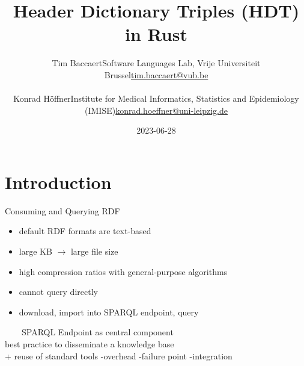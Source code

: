 \documentclass[14pt,aspectratio=169]{beamer}
\date{2023-06-28}
\author{
\small
\texorpdfstring{Tim Baccaert\newline{}Software Languages Lab, Vrije Universiteit Brussel\newline{}\url{tim.baccaert@vub.be}}{Tim Baccaert}\\~\\
\texorpdfstring{Konrad Höffner\newline{}Institute for Medical Informatics, Statistics and Epidemiology (IMISE)\newline{}\url{konrad.hoeffner@uni-leipzig.de}}{Konrad Höffner}
}
\title{Header Dictionary Triples (HDT) in Rust}
\subtitle{}
\newcommand{\imageslide}[4][]
{
\begin{frame}[plain]{~~~~#2}
\vspace{0.2em}
\centering\makebox[\linewidth]{\texttt{[image: \#3]}}
\\#1
\note{#4}
\end{frame}
}
\newcommand\pro{\item[$+$]}
\newcommand\con{\item[$-$]}
\begin{document}
\begin{frame}
\titlepage
\end{frame}

\section{Introduction}

\iffalse
\begin{frame}{Problem}
\enquote{
\ldots{}what the Semantic Web field most needs, at this stage, is consolidation\ldots
For \textbf{academics}, there is often limited incentive to develop and maintain \textbf{stable, easy-to-use software}\ldots
Consolidation of sorts is already happening in \textbf{industry}\ldots
Technical details\ldots{} are however \textbf{usually not shared}, presumably to protect the own competitive edge.
}
\\~\\
Pascal Hitzler: \emph{A Review of the Semantic Web Field}. 2021
\end{frame}
\fi

\begin{frame}{Consuming and Querying RDF}
\begin{itemize}
\item default RDF formats are text-based
\item large KB $\rightarrow$ large file size
\item high compression ratios with general-purpose algorithms
\item cannot query directly
\item download, import into SPARQL endpoint, query
\end{itemize}
\end{frame}

\imageslide[best practice to disseminate a knowledge base\\+ reuse of standard tools -overhead -failure point -integration]
{SPARQL Endpoint as central component}{img/architecture.pdf}{}

\iffalse
\begin{frame}{SPARQL Endpoints}
\begin{itemize}
\pro Linked Open Data best practice
\pro standard RDF query language
\pro reuse of standard tools
\pro update graphs with SPARUL
\pause
\con overhead on small graphs
\con timeouts
\con downtimes
\con separate component: failure point, hard to integrate
\end{itemize}
\end{frame}
\fi
\end{document}
